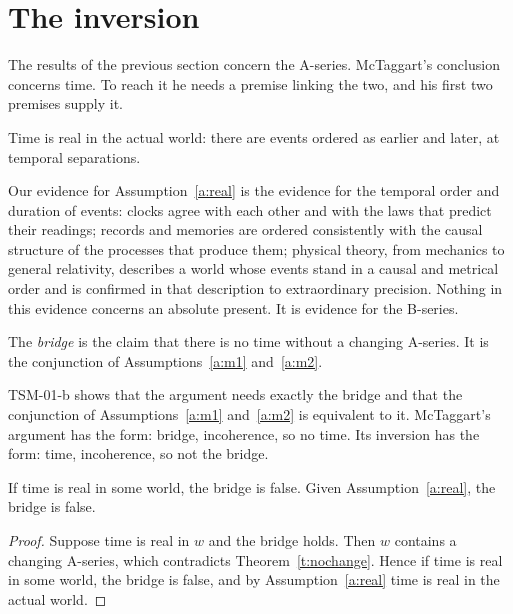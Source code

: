 \documentclass{situationist-preprint}
\begin{document}
\section{The inversion}\label{s:inversion}

The results of the previous section concern the A-series. McTaggart's conclusion concerns time. To reach it he needs a premise linking the two, and his first two premises supply it.

\begin{assumption}\label{a:real}
Time is real in the actual world: there are events ordered as earlier and later, at temporal separations.
\end{assumption}

Our evidence for Assumption~\ref{a:real} is the evidence for the temporal order and duration of events: clocks agree with each other and with the laws that predict their readings; records and memories are ordered consistently with the causal structure of the processes that produce them; physical theory, from mechanics to general relativity, describes a world whose events stand in a causal and metrical order and is confirmed in that description to extraordinary precision. Nothing in this evidence concerns an absolute present. It is evidence for the B-series.

\begin{definition}\label{d:bridge}
The \emph{bridge} is the claim that there is no time without a changing A-series. It is the conjunction of Assumptions~\ref{a:m1} and~\ref{a:m2}.
\end{definition}

TSM-01-b shows that the argument needs exactly the bridge and that the conjunction of Assumptions~\ref{a:m1} and~\ref{a:m2} is equivalent to it. McTaggart's argument has the form: bridge, incoherence, so no time. Its inversion has the form: time, incoherence, so not the bridge.

\begin{theorem}\label{t:inversion}
If time is real in some world, the bridge is false. Given Assumption~\ref{a:real}, the bridge is false.
\end{theorem}

\begin{proof}
Suppose time is real in $w$ and the bridge holds. Then $w$ contains a changing A-series, which contradicts Theorem~\ref{t:nochange}. Hence if time is real in some world, the bridge is false, and by Assumption~\ref{a:real} time is real in the actual world.
\end{proof}
\end{document}
